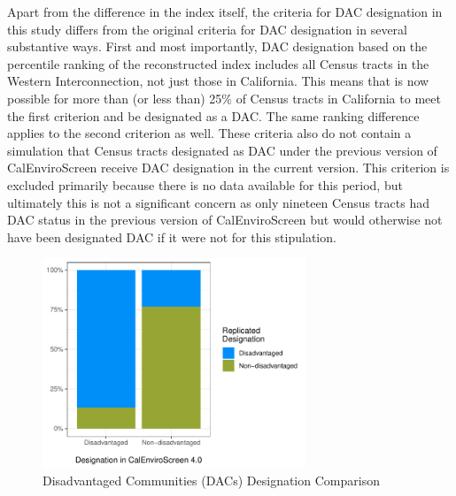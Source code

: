 Apart from the difference in the index itself, the criteria for DAC designation in this study differs from the original criteria for DAC designation in several substantive ways. First and most importantly, DAC designation based on the percentile ranking of the reconstructed index includes all Census tracts in the Western Interconnection, not just those in California. This means that is now possible for more than (or less than) 25\% of Census tracts in California to meet the first criterion and be designated as a DAC. The same ranking difference applies to the second criterion as well. These criteria also do not contain a simulation that Census tracts designated as DAC under the previous version of CalEnviroScreen receive DAC designation in the current version. This criterion is excluded primarily because there is no data available for this period, but ultimately this is not a significant concern as only nineteen Census tracts had DAC status in the previous version of CalEnviroScreen but would otherwise not have been designated DAC if it were not for this stipulation. 

\begin{figure}
    \centering
    \caption{Disadvantaged Communities (DACs) Designation Comparison \label{sb535_comp}}
    \includegraphics[width=0.7\textwidth]{figures/chapter5_figures/DAC_designation.pdf}
\end{figure}

